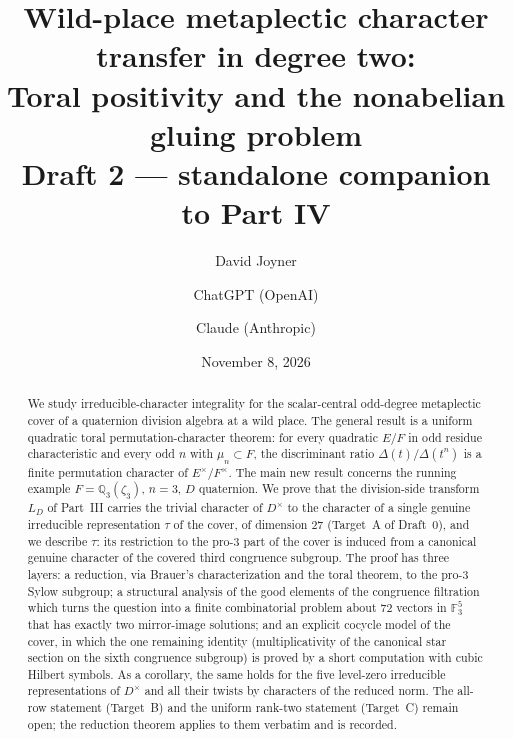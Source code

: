 \documentclass[11pt]{article}
\title{Wild-place metaplectic character transfer in degree two:\\
Toral positivity and the nonabelian gluing problem\\[0.4em]
\normalsize Draft 2 --- standalone companion to Part IV}
\author{David Joyner \and ChatGPT (OpenAI) \and Claude (Anthropic)}
\date{November 8, 2026}
\newcommand{\Q}{\mathbb Q}
\newcommand{\Fq}{\mathbb F}
\theoremstyle{plain}
\theoremstyle{definition}
\begin{document}
\maketitle
\begin{abstract}
We study irreducible-character integrality for the scalar-central
odd-degree metaplectic cover of a quaternion division algebra at a
wild place.  The general result is a uniform quadratic toral
permutation-character theorem: for every quadratic $E/F$ in odd
residue characteristic and every odd $n$ with $\mu_n\subset F$, the
discriminant ratio $\Delta(t)/\Delta(t^n)$ is a finite permutation
character of $E^\times/F^\times$.  The main new result concerns the
running example $F=\Q_3(\zeta_3)$, $n=3$, $D$ quaternion.  We prove
that the division-side transform $L_D$ of Part~III carries the
trivial character of $D^\times$ to the character of a single genuine
irreducible representation $\tau$ of the cover, of dimension $27$
(Target~A of Draft~0), and we describe $\tau$: its restriction to the
pro-$3$ part of the cover is induced from a canonical genuine
character of the covered third congruence subgroup.  The proof has
three layers: a reduction, via Brauer's characterization and the
toral theorem, to the pro-$3$ Sylow subgroup; a structural analysis
of the good elements of the congruence filtration which turns the
question into a finite combinatorial problem about $72$ vectors in
$\Fq_3^5$ that has exactly two mirror-image solutions; and an
explicit cocycle model of the cover, in which the one remaining
identity (multiplicativity of the canonical star section on the sixth
congruence subgroup) is proved by a short computation with cubic
Hilbert symbols.  As a corollary, the same
holds for the five level-zero irreducible representations of
$D^\times$ and all their twists by characters of the reduced norm.
The all-row statement (Target~B) and the uniform rank-two statement
(Target~C) remain open; the reduction theorem applies to them
verbatim and is recorded.
\end{abstract}
\tableofcontents
\end{document}

